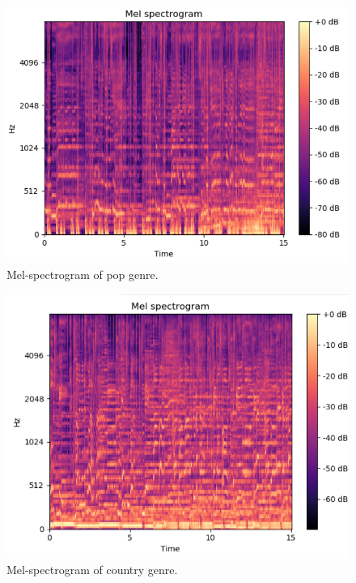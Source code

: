 \begin{figure}
\begin{center}
\includegraphics[scale=0.2]{./figures/pop.png}
\end{center}
\caption
{
Mel-spectrogram of pop genre. 
}
\label{fig:big_picture3}
\end{figure}

\begin{figure}
\begin{center}
\includegraphics[scale=0.2]{./figures/country.png}
\end{center}
\caption
{
Mel-spectrogram of country genre. 
}
\label{fig:big_picture4}
\end{figure}

